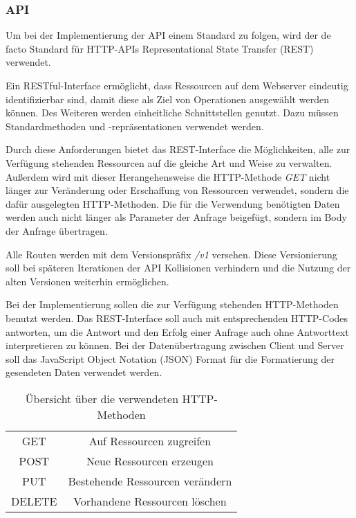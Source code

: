 \subsubsection{API}
Um bei der Implementierung der API einem Standard zu folgen, wird der de facto Standard für HTTP-APIs Representational State Transfer (REST) verwendet.

Ein RESTful-Interface ermöglicht, dass Ressourcen auf dem Webserver eindeutig identifizierbar sind, damit diese als Ziel von Operationen ausgewählt werden können. Des Weiteren werden einheitliche Schnittstellen genutzt. Dazu müssen Standardmethoden und -repräsentationen verwendet werden. \cite{beimsWebApplikationenREST2014}

Durch diese Anforderungen bietet das REST-Interface die Möglichkeiten, alle zur Verfügung stehenden Ressourcen auf die gleiche Art und Weise zu verwalten. Außerdem wird mit dieser Herangehensweise die HTTP-Methode \textit{GET} nicht länger zur Veränderung oder Erschaffung von Ressourcen verwendet, sondern die dafür ausgelegten HTTP-Methoden. Die für die Verwendung benötigten Daten werden auch nicht länger als Parameter der Anfrage beigefügt, sondern im Body der Anfrage übertragen. \cite{beimsWebApplikationenREST2014}

Alle Routen werden mit dem Versionspräfix \textit{/v1} versehen. Diese Versionierung soll bei späteren Iterationen der API Kollisionen verhindern und die Nutzung der alten Versionen weiterhin ermöglichen. 

Bei der Implementierung sollen die zur Verfügung stehenden HTTP-Methoden benutzt werden. Das REST-Interface soll auch mit entsprechenden HTTP-Codes antworten, um die Antwort und den Erfolg einer Anfrage auch ohne Antworttext interpretieren zu können. Bei der Datenübertragung zwischen Client und Server soll das JavaScript Object Notation (JSON) Format für die Formatierung der gesendeten Daten verwendet werden.

\begin{table}
	\centering
	\begin{tabular}{c c}
		GET & Auf Ressourcen zugreifen \\ 
		POST & Neue Ressourcen erzeugen \\  
		PUT & Bestehende Ressourcen verändern \\
		DELETE & Vorhandene Ressourcen löschen \\
	\end{tabular}
	\caption{Übersicht über die verwendeten HTTP-Methoden}
	\label{table:http-methods}
\end{table}

